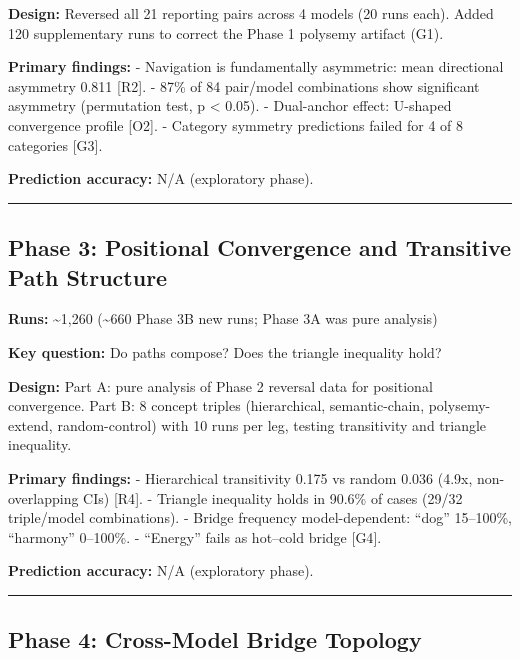 \textbf{Design:} Reversed all 21 reporting pairs across 4 models (20 runs each). Added 120 supplementary runs to correct the Phase 1 polysemy artifact (G1).

\textbf{Primary findings:} - Navigation is fundamentally asymmetric: mean directional asymmetry 0.811 {[}R2{]}. - 87\% of 84 pair/model combinations show significant asymmetry (permutation test, p \textless{} 0.05). - Dual-anchor effect: U-shaped convergence profile {[}O2{]}. - Category symmetry predictions failed for 4 of 8 categories {[}G3{]}.

\textbf{Prediction accuracy:} N/A (exploratory phase).

\begin{center}\rule{0.5\linewidth}{0.5pt}\end{center}

\subsection{Phase 3: Positional Convergence and Transitive Path Structure}\label{phase-3-positional-convergence-and-transitive-path-structure}

\textbf{Runs:} \textasciitilde1,260 (\textasciitilde660 Phase 3B new runs; Phase 3A was pure analysis)

\textbf{Key question:} Do paths compose? Does the triangle inequality hold?

\textbf{Design:} Part A: pure analysis of Phase 2 reversal data for positional convergence. Part B: 8 concept triples (hierarchical, semantic-chain, polysemy-extend, random-control) with 10 runs per leg, testing transitivity and triangle inequality.

\textbf{Primary findings:} - Hierarchical transitivity 0.175 vs random 0.036 (4.9x, non-overlapping CIs) {[}R4{]}. - Triangle inequality holds in 90.6\% of cases (29/32 triple/model combinations). - Bridge frequency model-dependent: ``dog'' 15--100\%, ``harmony'' 0--100\%. - ``Energy'' fails as hot--cold bridge {[}G4{]}.

\textbf{Prediction accuracy:} N/A (exploratory phase).

\begin{center}\rule{0.5\linewidth}{0.5pt}\end{center}

\subsection{Phase 4: Cross-Model Bridge Topology}\label{phase-4-cross-model-bridge-topology}

